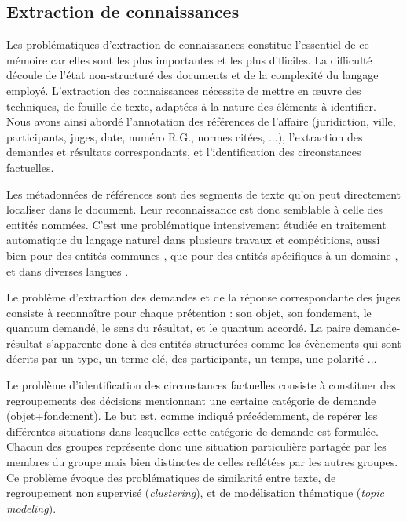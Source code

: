 \subsection{Extraction de connaissances}
\label{subsec:intro:ie}
Les problématiques d'extraction de connaissances constitue l'essentiel de ce mémoire car elles sont les plus importantes et les plus difficiles. La difficulté découle de l'état non-structuré des documents et de la complexité du langage employé. L'extraction des connaissances nécessite de mettre en \oe uvre des techniques, de fouille de texte, adaptées à la nature des éléments à identifier. Nous avons ainsi abordé l'annotation des références de l'affaire (juridiction, ville, participants, juges, date, numéro R.G., normes citées, ...), l'extraction des demandes et résultats correspondants, et l'identification des circonstances factuelles.

Les métadonnées de références sont des segments de texte qu'on peut directement localiser dans le document. Leur reconnaissance est donc semblable à celle des entités nommées. C'est une problématique intensivement étudiée en traitement automatique du langage naturel \citep{yadav2018surveyNeuralNER} dans plusieurs travaux et compétitions, aussi bien pour des entités communes \citep{tjong2003introCoNLL,grishman1996muc6}, que pour des entités spécifiques à un domaine \citep{kim2004bioNer, persson2012nbbioner,hanisch2005prominer}, et dans diverses langues \citep{li2018wcpbioner,alfred2014malayner,amarappa2015kannada}. 

Le problème d'extraction des demandes et de la réponse correspondante des juges consiste à reconnaître pour chaque prétention : son objet, son fondement, le quantum demandé, le sens du résultat, et le quantum accordé. La paire demande-résultat s'apparente donc à des entités structurées comme les évènements \cite{ace2005event} qui sont décrits par un type, un terme-clé, des participants, un temps, une polarité ... 

Le problème d'identification des circonstances factuelles consiste à constituer des regroupements des décisions mentionnant une certaine catégorie de demande (objet+fondement). Le but est, comme indiqué précédemment, de repérer les différentes situations dans lesquelles cette catégorie de demande est formulée. Chacun des groupes représente donc une situation particulière partagée par les membres du groupe mais bien distinctes de celles reflétées par les autres groupes. Ce problème évoque des problématiques de similarité entre texte, de regroupement non supervisé (\textit{clustering}), et de \og modélisation thématique \fg{} (\textit{topic modeling}).

